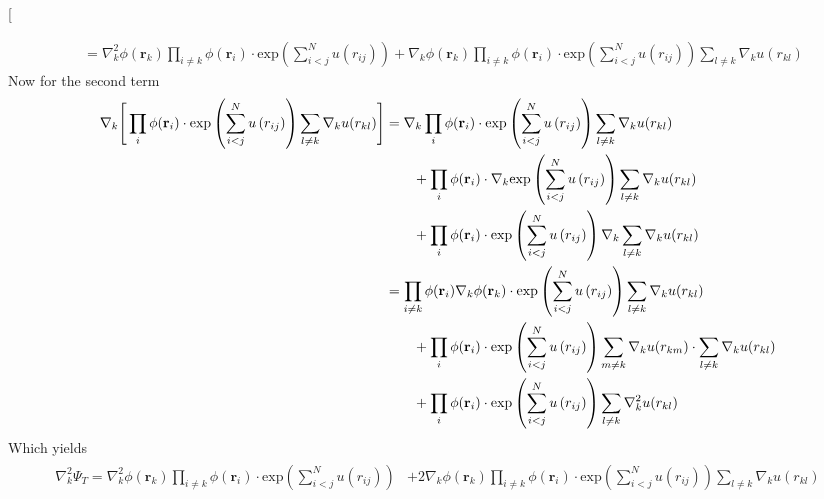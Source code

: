 \twocolumn[
    \begin{@twocolumnfalse}
        \begin{align}
            &= \nabla_k^2 \phi(\mathbf{r}_k) \prod_{i\neq k} \phi(\mathbf{r}_i) \cdot \text{exp} \left( \sum_{i<j}^N u \left( r_{ij} \right) \right) + \nabla_k \phi(\mathbf{r}_k) \prod_{i\neq k} \phi(\mathbf{r}_i) \cdot \text{exp} \left( \sum_{i<j}^N u \left( r_{ij} \right) \right) \sum_{l\neq k} \nabla_k u(r_{kl})
        \end{align}
        Now for the second term
        \begin{align}
            \begin{split}
                \nabla_k \Bigg{[} \prod_i \phi(\mathbf{r}_i) \cdot \text{exp} \left( \sum_{i<j}^N u \left( r_{ij} \right) \right) \sum_{l\neq k} \nabla_k u(r_{kl}) \Bigg{]} &= \nabla_k \prod_i \phi(\mathbf{r}_i) \cdot \text{exp} \left( \sum_{i<j}^N u \left( r_{ij} \right) \right) \sum_{l\neq k} \nabla_k u(r_{kl}) \\
                &\qquad + \prod_i \phi(\mathbf{r}_i)  \cdot \nabla_k \text{exp} \left( \sum_{i<j}^N u \left( r_{ij} \right) \right) \sum_{l\neq k} \nabla_k u(r_{kl}) \\
                &\qquad + \prod_i \phi(\mathbf{r}_i)  \cdot \text{exp} \left( \sum_{i<j}^N u \left( r_{ij} \right) \right) \nabla_k \sum_{l\neq k} \nabla_k u(r_{kl}) \\
                &= \prod_{i\neq k} \phi(\mathbf{r}_i) \nabla_k \phi(\mathbf{r}_k) \cdot \text{exp} \left( \sum_{i<j}^N u \left( r_{ij} \right) \right) \sum_{l\neq k} \nabla_k u(r_{kl}) \\
                &\qquad + \prod_i \phi(\mathbf{r}_i)  \cdot \text{exp} \left( \sum_{i<j}^N u \left( r_{ij} \right) \right) \sum_{m\neq k} \nabla_k u(r_{km}) \cdot \sum_{l\neq k} \nabla_k u(r_{kl}) \\
                &\qquad + \prod_i \phi(\mathbf{r}_i)  \cdot \text{exp} \left( \sum_{i<j}^N u \left( r_{ij} \right) \right) \sum_{l\neq k} \nabla_k^2 u(r_{kl})
            \end{split}
        \end{align}
        Which yields
        \begin{align}
            \begin{split}
                \nabla_k^2 \Psi_T =  \nabla_k^2 \phi(\mathbf{r}_k) \prod_{i\neq k} \phi(\mathbf{r}_i) \cdot \text{exp} \left( \sum_{i<j}^N u \left( r_{ij} \right) \right) &+ 2 \nabla_k \phi(\mathbf{r}_k) \prod_{i\neq k} \phi(\mathbf{r}_i) \cdot \text{exp} \left( \sum_{i<j}^N u \left( r_{ij} \right) \right) \sum_{l\neq k} \nabla_k u(r_{kl}) \\

\end{split}
\end{align}
\end{@twocolumnfalse}
